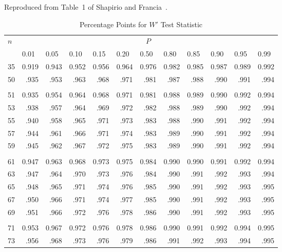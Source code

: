 \documentclass[draft]{article}
\begin{document}
\begin{table}
\caption{Percentage Points for \(W'\) Test Statistic}
\centerline{Reproduced from Table~1 of Shapirio and Francia~\cite{shapiro72b}.}
\label{tbl:w-prime-test}
\scriptsize
\begin{center}
\begin{tabular}{l@{\extracolsep{1pt}}r%
                 @{\extracolsep{1pt}}r%
                 @{\extracolsep{1pt}}r%
                 @{\extracolsep{1pt}}rrrrrrrr}\hline
\(n\) & \multicolumn{11}{c}{\(P\)} \\ \cline{2-12}
&
\multicolumn{1}{l}{0.01} &
\multicolumn{1}{l}{0.05} &
\multicolumn{1}{l}{0.10} &
\multicolumn{1}{l}{0.15} &
\multicolumn{1}{l}{0.20} &
\multicolumn{1}{l}{0.50} &
\multicolumn{1}{l}{0.80} &
\multicolumn{1}{l}{0.85} &
\multicolumn{1}{l}{0.90} &
\multicolumn{1}{l}{0.95} &
\multicolumn{1}{l}{0.99}\\
\hline
35&0.919&0.943&0.952&0.956&0.964&0.976&0.982&0.985&0.987&0.989&0.992\\
50& .935& .953& .963& .968& .971& .981& .987& .988& .990& .991& .994\\
\\
51&0.935&0.954&0.964&0.968&0.971&0.981&0.988&0.989&0.990&0.992&0.994\\
53& .938& .957& .964& .969& .972& .982& .988& .989& .990& .992& .994\\
55& .940& .958& .965& .971& .973& .983& .988& .990& .991& .992& .994\\
57& .944& .961& .966& .971& .974& .983& .989& .990& .991& .992& .994\\
59& .945& .962& .967& .972& .975& .983& .989& .990& .991& .992& .994\\
\\
61&0.947&0.963&0.968&0.973&0.975&0.984&0.990&0.990&0.991&0.992&0.994\\
63& .947& .964& .970& .973& .976& .984& .990& .991& .992& .993& .994\\
65& .948& .965& .971& .974& .976& .985& .990& .991& .992& .993& .995\\
67& .950& .966& .971& .974& .977& .985& .990& .991& .992& .993& .995\\
69& .951& .966& .972& .976& .978& .986& .990& .991& .992& .993& .995\\
\\
71&0.953&0.967&0.972&0.976&0.978&0.986&0.990&0.991&0.992&0.994&0.995\\
73& .956& .968& .973& .976& .979& .986& .991& .992& .993& .994& .995\\

\end{tabular}
\end{center}
\end{table}
\end{document}
